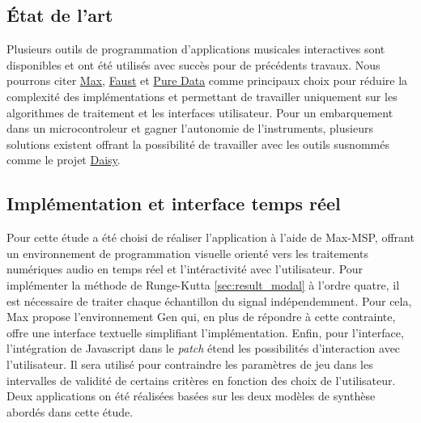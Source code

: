 \subsection{État de l'art}

Plusieurs outils de programmation d'applications musicales interactives sont disponibles et ont été utilisés avec succès pour de précédents travaux. 
Nous pourrons citer 
\href{https://cycling74.com/products/max}{Max},
\href{https://faust.grame.fr/}{Faust}
et 
\href{https://puredata.info}{Pure Data}
comme principaux choix pour réduire la complexité des implémentations et permettant de travailler uniquement sur les algorithmes de traitement et les interfaces utilisateur. 
Pour un embarquement dans un microcontroleur et gagner l'autonomie de l'instruments, plusieurs solutions existent offrant la possibilité de travailler avec les outils susnommés comme le projet \href{https://electro-smith.com/}{Daisy}.


\subsection{Implémentation et interface temps réel}

Pour cette étude a été choisi de réaliser l'application à l'aide de Max-MSP, offrant un environnement de programmation visuelle orienté vers les traitements numériques audio en temps réel et l'intéractivité avec l'utilisateur. 
Pour implémenter la méthode de Runge-Kutta \ref{sec:result_modal} à l'ordre quatre, il est nécessaire de traiter chaque échantillon du signal indépendemment.
Pour cela, Max propose l'environnement Gen qui, en plus de répondre à cette contrainte, offre une interface textuelle simplifiant l'implémentation.
Enfin, pour l'interface, l'intégration de Javascript dans le \textit{patch} étend les possibilités d'interaction avec l'utilisateur.
Il sera utilisé pour contraindre les paramètres de jeu dans les intervalles de validité de certains critères en fonction des choix de l'utilisateur.
Deux applications on été réalisées basées sur les deux modèles de synthèse abordés dans cette étude.




\begin{comment}
    brouillon d'abstract
\end{comment}